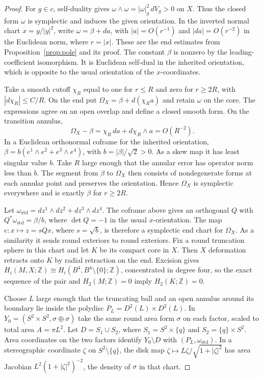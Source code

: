\documentclass[11pt,letterpaper]{article}
\numberwithin{equation}{section}
\begin{document}
\begin{proof}
For \(g\in c\), self-duality gives
\(\omega\wedge\omega=|\omega|_g^2\,dV_g>0\) on \(X\).
Thus the closed form \(\omega\) is symplectic and induces the given
orientation. In the inverted normal chart \(x=y/|y|^2\), write
\(\omega=\beta+da\), with \(|a|=O(r^{-1})\) and \(|da|=O(r^{-2})\)
in the Euclidean norm, where \(r=|x|\). These are the end estimates
from Proposition~\ref{prop:pole} and its proof. The constant
\(\beta\) is nonzero by the leading-coefficient isomorphism.
It is Euclidean self-dual in the inherited orientation, which is
opposite to the usual orientation of the \(x\)-coordinates.

Take a smooth cutoff \(\chi_R\) equal to one for \(r\le R\) and zero
for \(r\ge 2R\), with \(|d\chi_R|\le C/R\). On the end put
\(\Omega_X=\beta+d(\chi_Ra)\) and retain \(\omega\) on the core.
The expressions agree on an open overlap and define a closed smooth
form. On the transition annulus,
\[
 \Omega_X-\beta=\chi_R\,da+d\chi_R\wedge a=O(R^{-2}).
\]
In a Euclidean orthonormal coframe for the inherited orientation,
\(\beta=b(e^1\wedge e^2+e^3\wedge e^4)\), with
\(b=|\beta|/\sqrt2>0\). As a skew map it has least singular value
\(b\). Take \(R\) large enough that the annular error has operator
norm less than \(b\). The segment from \(\beta\) to \(\Omega_X\)
then consists of nondegenerate forms at each annular point and
preserves the orientation. Hence \(\Omega_X\) is symplectic everywhere
and is exactly \(\beta\) for \(r\ge 2R\).

Let \(\omega_{\mathrm{std}}=dz^1\wedge dz^2+dz^3\wedge dz^4\).
The coframe above gives an orthogonal \(Q\) with
\(Q^*\omega_{\mathrm{std}}=\beta/b\), where \(\det Q=-1\) in
the usual \(x\)-orientation. The map \(e\colon x\mapsto z=sQx\),
where \(s=\sqrt b\), is therefore a symplectic end chart for
\(\Omega_X\). As a similarity it sends round exteriors to round
exteriors. Fix a round truncation sphere in this chart and let \(K\)
be its compact core in \(X\). Then \(X\) deformation retracts onto
\(K\) by radial retraction on the end. Excision gives
\(H_i(M,X;\mathbb Z)\cong H_i(B^4,B^4\setminus\{0\};\mathbb Z)\),
concentrated in degree four, so the exact sequence of the pair and
\(H_2(M;\mathbb Z)=0\) imply \(H_2(K;\mathbb Z)=0\).

Choose \(L\) large enough that the truncating ball and an open
annulus around its boundary lie inside the polydisc
\(P_L=D^2(L)\times D^2(L)\). In
\(Y_0=(S^2\times S^2,\sigma\oplus\sigma)\) take the same round
area form \(\sigma\) on each factor, scaled to total area
\(A=\pi L^2\). Let
\(D=S_1\cup S_2\), where \(S_1=S^2\times\{q\}\) and
\(S_2=\{q\}\times S^2\). Area coordinates on the two factors identify
\(Y_0\setminus D\) with \((P_L,\omega_{\mathrm{std}})\). In a
stereographic coordinate \(\zeta\) on \(S^2\setminus\{q\}\),
the disk map \(\zeta\mapsto L\zeta/\sqrt{1+|\zeta|^2}\)
has area Jacobian \(L^2(1+|\zeta|^2)^{-2}\), the density of
\(\sigma\) in that chart.


\end{proof}
\end{document}
